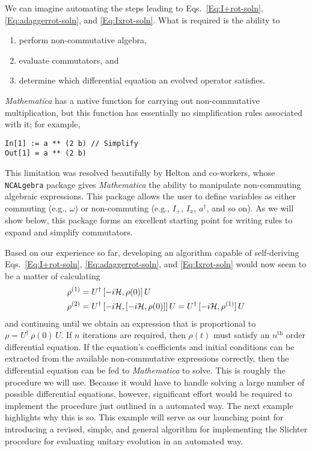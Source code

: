 We can imagine automating the steps leading to Eqs.~\ref{Eq:I+rot-soln}, \ref{Eq:adaggerrot-soln}, and \ref{Eq:Ixrot-soln}.   What is required is the ability to
\begin{enumerate}

\item perform non-commutative algebra, 

\item evaluate commutators, and

\item determine which differential equation an evolved operator satisfies.

\end{enumerate}
\emph{Mathematica} has a native function for carrying out non-commutative multiplication, but this function has essentially no simplification rules associated with it; for example,
\begin{Verbatim}[xleftmargin=0.25in]
In[1] := a ** (2 b) // Simplify
Out[1] = a ** (2 b)
\end{Verbatim}
This limitation was resolved beautifully by Helton and co-workers, whose \verb+NCALgebra+ package \cite{Helton2015feb} gives \emph{Mathematica} the ability to manipulate non-commuting algebraic expressions.  This package allows the user to define variables as either commuting (e.g., $\omega$) or non-commuting (e.g., $I_+$, $I_x$, $a^{\dagger}$, and so on).  As we will show below, this package forms an excellent starting point for writing rules to expand and simplify commutators.  

Based on our experience so far, developing an algorithm capable of self-deriving Eqs.~\ref{Eq:I+rot-soln}, \ref{Eq:adaggerrot-soln}, and \ref{Eq:Ixrot-soln} would now seem to be a matter of calculating
\begin{align}
\rho^{(1)} & = U^{\dagger} \, [-i {\cal H}, \rho(0)] \, U \\
\rho^{(2)} & = U^{\dagger} \, [-i {\cal H}, [-i {\cal H}, \rho(0)]] \, U
	= U^{\dagger} \, [-i {\cal H}, \rho^{(1)}] \, U
\end{align}
and continuing until we obtain an expression that is proportional to $\rho = U^{\dagger} \, \rho(0) \, U$. If $n$ iterations are required, then $\rho(t)$ must satisfy an $n^\text{th}$ order differential equation.  If the equation's coefficients and initial conditions can be extracted from the  available non-commutative expressions correctly, then the differential equation can be fed to \emph{Mathematica} to solve.  This is roughly the procedure we will use.  Because it would have to handle solving a large number of possible differential equations, however, significant effort would be required to implement the procedure just outlined in a automated way.  The next example highlights why this is so.  This example will serve as our launching point for introducing a revised, simple, and general algorithm for implementing the Slichter procedure for evaluating unitary evolution in an automated way. 

